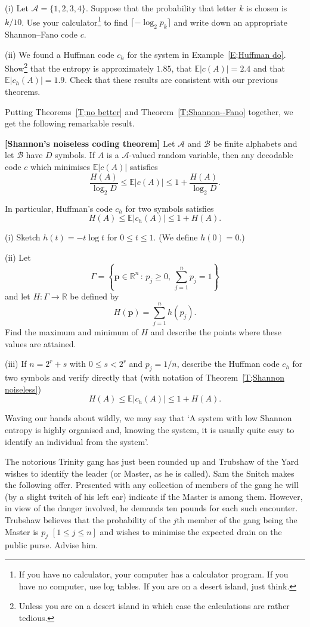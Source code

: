 \begin{exercise}\label{E;Fano}
(i) Let ${\mathcal A}=\{1,2,3,4\}$. Suppose that the
probability
that letter $k$ is chosen is $k/10$.
Use your calculator\footnote{If you have no calculator,
your computer has a calculator program. If you have 
no computer, use log tables. If you are on a desert
island, just think.} to find $\lceil -\log_{2} p_{k}\rceil$
and write down an appropriate Shannon--Fano code $c$.

(ii) We found a Huffman code $c_{h}$ for the system
in Example~\ref{E;Huffman do}. 
Show\footnote {Unless you are on a desert island
in which case the calculations are rather tedious.} 
that the entropy is approximately $1.85$,
that ${\mathbb E}|c(A)|=2.4$
and that  ${\mathbb E}|c_{h}(A)|=1.9$.
Check that these results are consistent with 
our previous theorems.
\end{exercise}
Putting Theorems~\ref{T;no better} and Theorem~\ref{T;Shannon--Fano}
together,
we get the following remarkable result.
\begin{theorem}\label{T;Shannon noiseless}%
{\bf[Shannon's noiseless coding theorem]} 
Let ${\mathcal A}$ and ${\mathcal B}$
be finite alphabets and let ${\mathcal B}$ have $D$ symbols. If 
$A$ is a ${\mathcal A}$-valued random variable, 
then any decodable code $c$ which minimises ${\mathbb E}|c(A)|$
satisfies
\[\frac{H(A)}{\log_{2} D}\leq
{\mathbb E}|c(A)|\leq 1+\frac{H(A)}{\log_{2} D}.\]
\end{theorem}
In particular,  Huffman's code $c_{h}$ for two symbols satisfies
 \[H(A)\leq
{\mathbb E}|c_{h}(A)|\leq 1+H(A).\]
\begin{exercise} (i) Sketch $h(t)=-t\log t$ for $0\leq t\leq 1$.
(We define $h(0)=0$.)

(ii) Let
\[\Gamma=\left\{{\mathbf p}\in{\mathbb R}^{n}
\,:\,p_{j}\geq 0,\ \sum_{j=1}^{n}p_{j}=1\right\}\]
and let $H:\Gamma\rightarrow{\mathbb R}$ be defined by
\[H({\mathbf p})=\sum_{j=1}^{n}h(p_{j}).\]
Find the maximum and minimum of $H$ and 
describe the points where these values are attained.

(iii) If $n=2^{r}+s$ with $0\leq s< 2^{r}$ and $p_{j}=1/n$,
describe the Huffman code $c_{h}$ for two symbols
and verify directly that (with notation
of Theorem~\ref{T;Shannon noiseless}) 
\[H(A)\leq
{\mathbb E}|c_{h}(A)|\leq 1+H(A).\]
\end{exercise}
Waving our hands about wildly, we may say that
`A system with low Shannon entropy is highly
organised and, knowing the system, it is
usually quite easy to identify an individual from the
system'.
\begin{exercise} The notorious Trinity gang 
has just been rounded up and
Trubshaw of the Yard wishes to identify the leader (or Master,
as he is called). Sam the Snitch makes the following offer.
Presented with any collection of members of the gang
he will (by a slight twitch of his left ear)
indicate if the Master is among them. However, in
view of the danger involved, he demands ten pounds
for each such encounter. Trubshaw believes that
the probability of the $j$th member of the gang being
the Master is $p_{j}$ $[1\leq j\leq n]$
and wishes to minimise the expected drain on the public purse.
Advise him.
\end{exercise}
